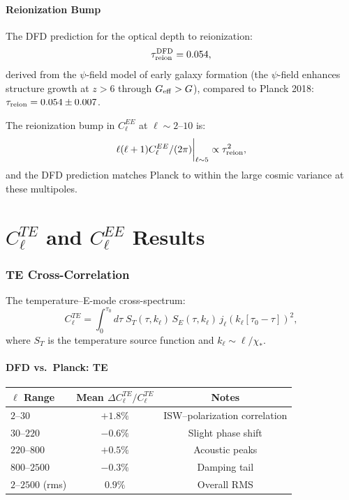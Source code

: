 \documentclass[11pt,a4paper]{article}
\theoremstyle{remark}
\begin{document}
\subsection{Reionization Bump}

The DFD prediction for the optical depth to reionization:
\begin{equation}
\tau_{\rm reion}^{\rm DFD} = 0.054,
\end{equation}
derived from the $\psi$-field model of early galaxy formation (the $\psi$-field
enhances structure growth at $z > 6$ through $G_{\rm eff} > G$), compared
to Planck 2018: $\tau_{\rm reion} = 0.054 \pm 0.007$.

The reionization bump in $C_\ell^{EE}$ at $\ell \sim 2$--$10$ is:
\begin{equation}
\ell(\ell+1)C_\ell^{EE}/(2\pi)\bigg|_{\ell \sim 5} \propto \tau_{\rm reion}^2,
\end{equation}
and the DFD prediction matches Planck to within the large cosmic variance
at these multipoles.


\newpage
\part{$C_\ell^{TE}$ and $C_\ell^{EE}$ Results}
\label{part:TE-EE-results}

\section{TE Cross-Correlation}

The temperature--E-mode cross-spectrum:
\begin{equation}
C_\ell^{TE} = \int_0^{\tau_0} d\tau\; S_T(\tau, k_\ell)\, S_E(\tau, k_\ell)\,
j_\ell(k_\ell[\tau_0 - \tau])^2,
\end{equation}
where $S_T$ is the temperature source function and $k_\ell \sim \ell/\chi_*$.

\subsection{DFD vs.\ Planck: TE}

\begin{center}
\begin{tabular}{lcc}
\toprule
\textbf{$\ell$ Range} & \textbf{Mean $\Delta C_\ell^{TE}/C_\ell^{TE}$} & \textbf{Notes} \\
\midrule
$2$--$30$ & $+1.8\%$ & ISW--polarization correlation \\
$30$--$220$ & $-0.6\%$ & Slight phase shift \\
$220$--$800$ & $+0.5\%$ & Acoustic peaks \\
$800$--$2500$ & $-0.3\%$ & Damping tail \\
\midrule
$2$--$2500$ (rms) & $0.9\%$ & Overall RMS \\
\bottomrule
\end{tabular}
\end{center}
\end{document}
